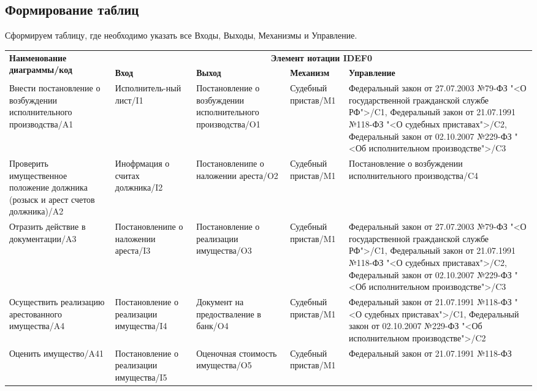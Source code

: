 \subsection{Формирование таблиц}
Сформируем таблицу, где необходимо указать все Входы, Выходы, Механизмы и
Управление.
{\small
\begin{longtable}{ |p{}
	|p{}
	|p{}
	|p{}
	|p{}
	| } 
	\hline
	\multirow{2}{0.23\textwidth}{\textbf{Наименование диаграммы/код}}
		& \multicolumn{4}{|c|}{\textbf{Элемент нотации IDEF0}} \\ \cline{2-5}
		& \textbf{Вход} & \textbf{Выход}
		& \textbf{Механизм} & \textbf{Управление} \\ \hline
	\endhead
	Внести постановление о возбуждении исполнительного производства/A1
		& Исполнитель-ный лист/I1
		& Постановление о возбуждении исполнительного производства/O1
		& Судебный пристав/M1
		& Федеральный закон от 27.07.2003 №79-ФЗ
			"<О государственной гражданской службе РФ">/C1,
			Федеральный закон от 21.07.1991 №118-ФЗ
				"<О судебных приставах">/C2,
			Федеральный закон от 02.10.2007 №229-ФЗ
				"<Об исполнительном производстве">/C3 \\ \hline 
	Проверить имущественное положение должника
		(розыск и арест счетов должника)/A2
		& Инофрмация о считах должника/I2
		& Постановленипе о наложении ареста/O2
		& Судебный пристав/M1
		& Постановление о возбуждении исполнительного
			производства/C4 \\ \hline 
	Отразить действие в документации/A3
		& Постановленипе о наложении ареста/I3
		& Постановление о реализации имущества/O3
		& Судебный пристав/M1
		& Федеральный закон от 27.07.2003 №79-ФЗ
			"<О государственной гражданской службе РФ">/C1,
			Федеральный закон от 21.07.1991 №118-ФЗ
				"<О судебных приставах">/C2,
			Федеральный закон от 02.10.2007 №229-ФЗ
				"<Об исполнительном производстве">/C3 \\ \hline 
	Осуществить реализацию арестованного имущества/A4
		& Постановление о реализации имущества/I4
		& Документ на предостваление в банк/O4
		& Судебный пристав/M1
		& Федеральный закон от 21.07.1991 №118-ФЗ
			"<О судебных приставах">/C1,
			Федеральный закон от 02.10.2007 №229-ФЗ
			"<Об исполнительном производстве">/C2 \\ \hline 
	Оценить имущество/A41
		& Постановление о реализации имущества/I5
		& Оценочная стоимость имущества/O5
		& Судебный пристав/M1
		& Федеральный закон от 21.07.1991 №118-ФЗ

\end{longtable}}
